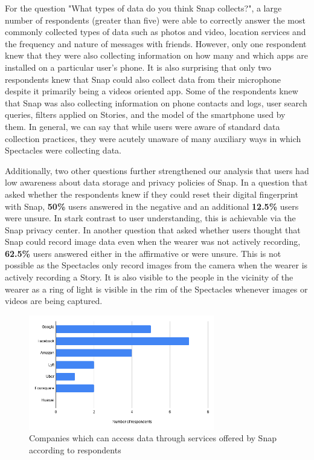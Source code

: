 \documentclass[sigconf]{acmart}
\begin{document}
For the question "What types of data do you think Snap collects?", a large number of respondents (greater than five) were able to correctly answer the most commonly collected types of data such as photos and video, location services and the frequency and nature of messages with friends. However, only one respondent knew that they were also collecting information on how many and which apps are installed on a particular user's phone. It is also surprising that only two respondents knew that Snap could also collect data from their microphone despite it primarily being a videos oriented app. Some of the respondents knew that Snap was also collecting information on phone contacts and logs, user search queries, filters applied on Stories, and the model of the smartphone used by them. In general, we can say that while users were aware of standard data collection practices, they were acutely unaware of many auxiliary ways in which Spectacles were collecting data. 

Additionally, two other questions further strengthened our analysis that users had low awareness about data storage and privacy policies of Snap. In a question that asked whether the respondents knew if they could reset their digital fingerprint with Snap, \textbf{50\%} users answered in the negative and an additional \textbf{12.5\%} users were unsure. In stark contrast to user understanding, this is achievable via the Snap privacy center. In another question that asked whether users thought that Snap could record image data even when the wearer was not actively recording, \textbf{62.5\%} users answered either in the affirmative or were unsure. This is not possible as the Spectacles only record images from the camera when the wearer is actively recording a Story. It is also visible to the people in the vicinity of the wearer as a ring of light is visible in the rim of the Spectacles whenever images or videos are being captured.    

\begin{figure}[h]
  \centering
  \includegraphics[height=5cm,width=\linewidth]{snap_companies.png}
  \caption{Companies which can access data through services offered by Snap according to respondents}
  \label{fig:snap_data_collect}
  \Description{}
\end{figure}
\end{document}
